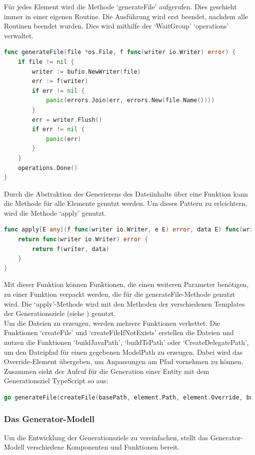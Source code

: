 \documentclass[./einleitung.tex]{subfiles}
\begin{document}
    Für jedes Element wird die Methode `generateFile' aufgerufen.
    Dies geschieht immer in einer eigenen Routine.
    Die Ausführung wird erst beendet, nachdem alle Routinen beendet wurden.
    Dies wird mithilfe der `WaitGroup' `operations' verwaltet.
    \begin{lstlisting}[language=Go, caption=Die Methode generateFile, label=lst:generateFile]
func generateFile(file *os.File, f func(writer io.Writer) error) {
	if file != nil {
		writer := bufio.NewWriter(file)
		err := f(writer)
		if err != nil {
			panic(errors.Join(err, errors.New(file.Name())))
		}
		err = writer.Flush()
		if err != nil {
			panic(err)
		}
	}
	operations.Done()
}
    \end{lstlisting}
    Durch die Abstraktion des Generierens des Dateiinhalts über eine Funktion kann die Methode für alle Elemente genutzt werden.
    Um dieses Pattern zu erleichtern,  wird die Methode `apply' genutzt.
    \begin{lstlisting}[language=Go, caption=Die apply-Methode, label=lst:apply]
func apply[E any](f func(writer io.Writer, e E) error, data E) func(writer io.Writer) error {
	return func(writer io.Writer) error {
		return f(writer, data)
	}
}
    \end{lstlisting}
    Mit dieser Funktion können Funktionen, die einen weiteren Parameter benötigen, zu einer Funktion verpackt werden, die für die generateFile-Methode genutzt wird.
    Die `apply'-Methode wird mit den Methoden der verschiedenen Templates der Generationsziele (siehe ) genutzt.\\

    Um die Dateien zu erzeugen, werden mehrere Funktionen verkettet.
    Die Funktionen `createFile' und `createFileIfNotExists' erstellen die Dateien und nutzen die Funktionen `buildJavaPath', `buildTsPath' oder `CreateDelegatePath', um den Dateipfad für einen gegebenen ModelPath zu erzeugen.
    Dabei wird das Override-Element übergeben, um Anpassungen am Pfad vornehmen zu können.\\
    Zusammen sieht der Aufruf für die Generation einer Entity mit dem Generationsziel TypeScript so aus:
    \begin{lstlisting}[language=Go, caption=Generation einer Entity, label=lst:generateEntity]
go generateFile(createFile(basePath, element.Path, element.Override, buildTsPath), apply(template.GenerateEntity, element))
    \end{lstlisting}

    \subsubsection{Das Generator-Modell}\label{subsubsec:generator-modell}
    Um die Entwicklung der Generationsziele zu vereinfachen, stellt das Generator-Modell verschiedene Komponenten und Funktionen bereit.
\end{document}
